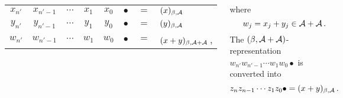 \documentclass[25pt, a0paper, portrait, margin=0mm, innermargin=15mm, blockverticalspace=15mm, colspace=15mm, subcolspace=8mm]{tikzposter}
\begin{document}
\begin{columns}
{	\begin{center}
	\begin{tabular}{ccccclcl}
	$x_{n'}$ & $x_{{n'}-1}$ & $\cdots$ & $x_1$ &$x_0$ &$\bullet$ & $=$& $(x)_{\beta,\mathcal{A}}$ \\%
	$y_{n'}$ & $y_{{n'}-1}$ & $\cdots$ & $y_1$ &$y_0$ &$\bullet$ & $=$& $(y)_{\beta,\mathcal{A}}$ \\ \hline %
	$w_{n'}$ & $w_{{n'}-1}$ & $\cdots$ & $w_1$ &$w_0$ &$\bullet$ & $=$& $(x+y)_{\beta,\mathcal{A}+\mathcal{A}}$\,, %
	\end{tabular}	
	\end{center}
	  where
	  $$
	    w_j=x_j+y_j \in \mathcal{A} +\mathcal{A}\,.
	  $$
	  The $(\beta,\mathcal{A}+\mathcal{A})$-representation $w_{n'} w_{{n'}-1} \cdots w_1 w_0 \bullet$  is converted into $$z_{n} z_{n-1}\cdots z_1 z_0 \bullet=(x+y)_{\beta,\mathcal{A}}\,.$$
	}

\end{columns}

\end{document}
